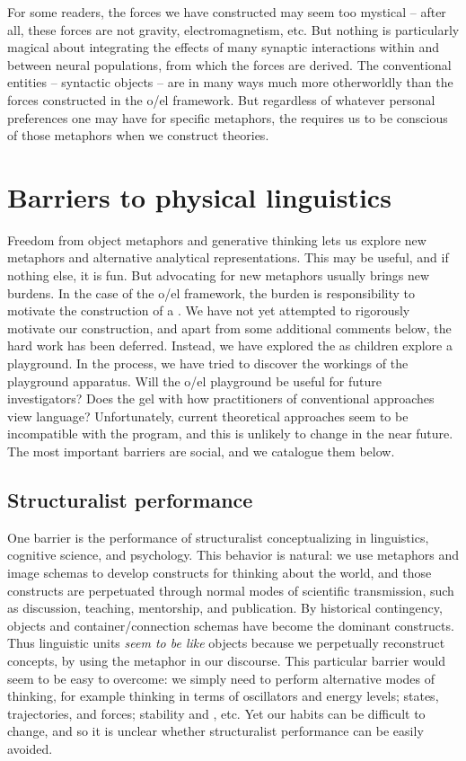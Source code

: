   For some readers, the forces we have constructed may seem too mystical -- after all, these forces are not gravity, electromagnetism, etc. But nothing is particularly magical about integrating the effects of many synaptic interactions within and between neural populations, from which the forces are derived. The conventional entities -- syntactic objects -- are in many ways much more otherworldly than the forces constructed in the o/el framework. But regardless of whatever personal preferences one may have for specific metaphors, the  requires us to be conscious of those metaphors when we construct theories.

\section{Barriers to physical linguistics}

Freedom from object metaphors and generative thinking lets us explore new metaphors and alternative analytical representations. This may be useful, and if nothing else, it is fun. But advocating for new metaphors usually brings new burdens. In the case of the o/el framework, the burden is responsibility to motivate the construction of a . We have not yet attempted to rigorously motivate our  construction, and apart from some additional comments below, the hard work has been deferred. Instead, we have explored the  as children explore a playground. In the process, we have tried to discover the workings of the playground apparatus. Will the o/el playground be useful for future investigators? Does the  gel with how practitioners of conventional approaches view language? Unfortunately, current theoretical approaches seem to be incompatible with the  program, and this is unlikely to change in the near future. The most important barriers are social, and we catalogue them below.

\subsection{Structuralist performance}

One barrier is the performance of structuralist conceptualizing in linguistics, cognitive science, and psychology. This behavior is natural: we use metaphors and image schemas to develop constructs for thinking about the world, and those constructs are perpetuated through normal modes of scientific transmission, such as discussion, teaching, mentorship, and publication. By historical contingency, objects and container/connection schemas have become the dominant constructs. Thus linguistic units \textit{seem to be like} objects because we perpetually reconstruct  concepts, by using the metaphor in our discourse. This particular barrier would seem to be easy to overcome: we simply need to perform alternative modes of thinking, for example thinking in terms of oscillators and energy levels; states, trajectories, and forces; stability and , etc. Yet our habits can be difficult to change, and so it is unclear whether structuralist performance can be easily avoided. 

